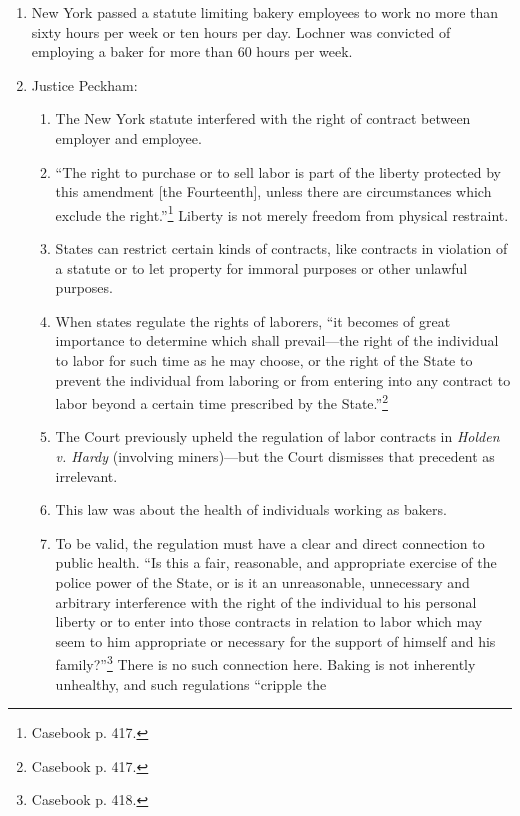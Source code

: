 \begin{enumerate}
    \item New York passed a statute limiting bakery employees to work no more 
    than sixty hours per week or ten hours per day. Lochner was convicted of 
    employing a baker for more than 60 hours per week.
    \item Justice Peckham:
    \begin{enumerate}
        \item The New York statute interfered with the right of contract 
        between employer and employee.
        \item ``The right to purchase or to sell labor is part of the liberty 
        protected by this amendment [the Fourteenth], unless there are 
        circumstances which exclude the right.''\footnote{Casebook p. 417.} 
        Liberty is not merely freedom from physical restraint.
        \item States can restrict certain kinds of contracts, like contracts 
        in violation of a statute or to let property for immoral purposes or 
        other unlawful purposes.
        \item When states regulate the rights of laborers, ``it becomes of 
        great importance to determine which shall prevail---the right of the 
        individual to labor for such time as he may choose, or the right of 
        the State to prevent the individual from laboring or from entering 
        into any contract to labor beyond a certain time prescribed by the 
        State.''\footnote{Casebook p. 417.}
        \item The Court previously upheld the regulation of labor contracts in 
        \emph{Holden v. Hardy} (involving miners)---but the Court dismisses 
        that precedent as irrelevant.
        \item This law was about the health of individuals working as bakers.
        \item To be valid, the regulation must have a clear and direct 
        connection to public health. ``Is this a fair, reasonable, and 
        appropriate exercise of the police power of the State, or is it an 
        unreasonable, unnecessary and arbitrary interference with the right of 
        the individual to his personal liberty or to enter into those 
        contracts in relation to labor which may seem to him appropriate or 
        necessary for the support of himself and his 
        family?''\footnote{Casebook p. 418.} There is no such connection here. 
        Baking is not inherently unhealthy, and such regulations ``cripple the 

\end{enumerate}
\end{enumerate}

